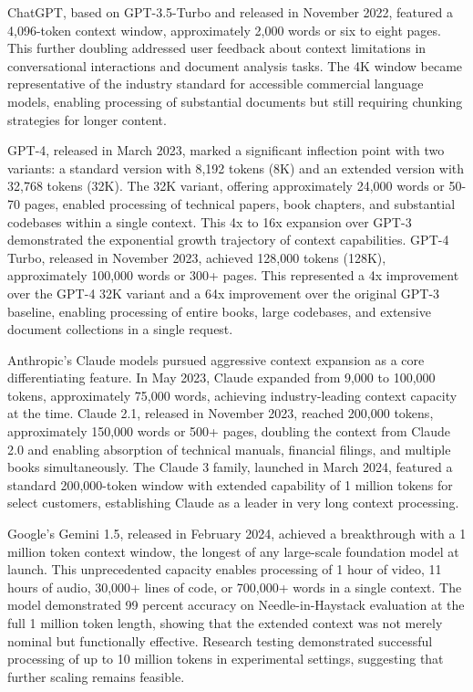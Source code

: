 ChatGPT, based on GPT-3.5-Turbo and released in November 2022, featured a 4,096-token context window, approximately 2,000 words or six to eight pages. This further doubling addressed user feedback about context limitations in conversational interactions and document analysis tasks. The 4K window became representative of the industry standard for accessible commercial language models, enabling processing of substantial documents but still requiring chunking strategies for longer content.

GPT-4, released in March 2023, marked a significant inflection point with two variants: a standard version with 8,192 tokens (8K) and an extended version with 32,768 tokens (32K). The 32K variant, offering approximately 24,000 words or 50-70 pages, enabled processing of technical papers, book chapters, and substantial codebases within a single context. This 4x to 16x expansion over GPT-3 demonstrated the exponential growth trajectory of context capabilities. GPT-4 Turbo, released in November 2023, achieved 128,000 tokens (128K), approximately 100,000 words or 300+ pages. This represented a 4x improvement over the GPT-4 32K variant and a 64x improvement over the original GPT-3 baseline, enabling processing of entire books, large codebases, and extensive document collections in a single request.

Anthropic's Claude models pursued aggressive context expansion as a core differentiating feature. In May 2023, Claude expanded from 9,000 to 100,000 tokens, approximately 75,000 words, achieving industry-leading context capacity at the time. Claude 2.1, released in November 2023, reached 200,000 tokens, approximately 150,000 words or 500+ pages, doubling the context from Claude 2.0 and enabling absorption of technical manuals, financial filings, and multiple books simultaneously. The Claude 3 family, launched in March 2024, featured a standard 200,000-token window with extended capability of 1 million tokens for select customers, establishing Claude as a leader in very long context processing.

Google's Gemini 1.5, released in February 2024, achieved a breakthrough with a 1 million token context window, the longest of any large-scale foundation model at launch. This unprecedented capacity enables processing of 1 hour of video, 11 hours of audio, 30,000+ lines of code, or 700,000+ words in a single context. The model demonstrated 99 percent accuracy on Needle-in-Haystack evaluation at the full 1 million token length, showing that the extended context was not merely nominal but functionally effective. Research testing demonstrated successful processing of up to 10 million tokens in experimental settings, suggesting that further scaling remains feasible.

